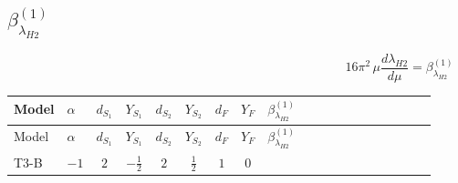 \documentclass{article}
\begin{document}
\begin{landscape}
\section*{$\beta_{\lambda_{H2}}^{(1)}$}
\[16\pi^2\,\mu\frac{d \lambda_{H2}}{d\mu}=\beta_{\lambda_{H2}}^{(1)}\]
\tiny
\begin{longtable}{@{}llcccccc >{\raggedright\arraybackslash}p{0.54\linewidth}@{}}
\toprule
Model & $\alpha$ & $d_{S_1}$ & $Y_{S_1}$ & $d_{S_2}$ & $Y_{S_2}$ & $d_F$ & $Y_F$ & $\beta_{\lambda_{H2}}^{(1)}$ \\
\midrule
\endfirsthead
\toprule
Model & $\alpha$ & $d_{S_1}$ & $Y_{S_1}$ & $d_{S_2}$ & $Y_{S_2}$ & $d_F$ & $Y_F$ & $\beta_{\lambda_{H2}}^{(1)}$ \\
\midrule
\endhead
T3-B & $-1$ & $2$ & $-\frac{1}{2}$ & $2$ & $\frac{1}{2}$ & $1$ & $0$ & \scriptsize\adjustbox{max width=\linewidth}{$\begin{gathered} {\lambda_{H2}} (2 \operatorname{Tr}\!\left({y_2}\,\left({y_2}\right)^{\dagger}\right)+6 \operatorname{Tr}\!\left({Y_d}\,\left({Y_d}\right)^{\dagger}\right)+2 \operatorname{Tr}\!\left({Y_e}\,\left({Y_e}\right)^{\dagger}\right)+6 \operatorname{Tr}\!\left({Y_u}\,\left({Y_u}\right)^{\dagger}\right)) \\ +{\lambda_{H H^\dagger S_1^\dagger S_2^\dagger}^{\rm Cross}} \left(\frac{1}{2} \operatorname{Tr}\!\left({y_1}\,\left({y_2}\right)^{\dagger}\right)+4 \left({\lambda_{H H^\dagger S_1^\dagger S_2^\dagger}^{\rm Cross}}\right)^{*}+3 \left({\lambda_{S_1^\dagger S_2 S_2^{\dagger 2}}}\right)^{*}\right) \\ +\frac{1}{2} \left({\lambda_{H H^\dagger S_1^\dagger S_2^\dagger}^{\rm Cross}}\right)^{*} \operatorname{Tr}\!\left({y_2}\,\left({y_1}\right)^{\dagger}\right) \\ -2 \operatorname{Tr}\!\left({y_2}\,\left({y_2}\right)^{\dagger}\,{Y_e}\,\left({Y_e}\right)^{\dagger}\right) \\ +3 {\lambda_{S_1^\dagger S_2 S_2^{\dagger 2}}} \left({\lambda_{H H^\dagger S_1^\dagger S_2^\dagger}^{\rm Cross}}\right)^{*} \\ +24 {\lambda_{H^\dagger H^\dagger S_2 S_2}} \left({\lambda_{H^\dagger H^\dagger S_2 S_2}}\right)^{*} \\ +6 {\lambda_{T3}} \left({\lambda_{T3}}\right)^{*} \\ +\frac{9 {g_2}^4}{4} \\ -9 {g_2}^2 {\lambda_{H2}} \\ +\frac{3 {g_Y}^4}{4} \\ -3 {g_Y}^2 {\lambda_{H2}} \\ +4 {\lambda_{12}} {\lambda_{H1}} \\ +6 {\lambda_H} {\lambda_{H2}} \\ +4 {\lambda_{H2}}^2 \\ +6 {\lambda_{H2}} {\lambda_{S_2}} \\ +\frac{3 {\lambda_{H2}^{\rm Adj}}^2}{4}\end{gathered}$} \\

\end{longtable}
\end{landscape}
\end{document}
